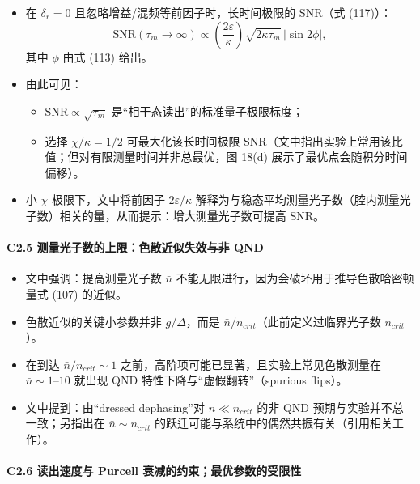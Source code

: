 \documentclass[12pt,a4paper,oneside]{ctexbook}
\providecommand{\tightlist}{%
  \setlength{\itemsep}{0pt}\setlength{\parskip}{0pt}}
\let\oldparagraph\paragraph
\renewcommand{\paragraph}[1]{\oldparagraph{#1}\mbox{}}
\begin{document}
\begin{itemize}
\tightlist
\item
  在 \(\delta_r=0\) 且忽略增益/混频等前因子时，长时间极限的 SNR（式
  (117)）： \[
  \mathrm{SNR}(\tau_m\rightarrow\infty)\propto
  \left(\frac{2\varepsilon}{\kappa}\right)\sqrt{2\kappa\tau_m}\,|\sin 2\phi|,
  \] 其中 \(\phi\) 由式 (113) 给出。
\item
  由此可见：

  \begin{itemize}
  \tightlist
  \item
    \(\mathrm{SNR}\propto \sqrt{\tau_m}\)
    是``相干态读出''的标准量子极限标度；
  \item
    选择 \(\chi/\kappa=1/2\) 可最大化该长时间极限
    SNR（文中指出实验上常用该比值；但对有限测量时间并非总最优，图 18(d)
    展示了最优点会随积分时间偏移）。
  \end{itemize}
\item
  小 \(\chi\) 极限下，文中将前因子 \(2\varepsilon/\kappa\)
  解释为与稳态平均测量光子数（腔内测量光子数）相关的量，从而提示：增大测量光子数可提高
  SNR。
\end{itemize}

\paragraph{C2.5 测量光子数的上限：色散近似失效与非
QND}\label{c2.5-ux6d4bux91cfux5149ux5b50ux6570ux7684ux4e0aux9650ux8272ux6563ux8fd1ux4f3cux5931ux6548ux4e0eux975e-qnd}

\begin{itemize}
\tightlist
\item
  文中强调：提高测量光子数 \(\bar{n}\)
  不能无限进行，因为会破坏用于推导色散哈密顿量式 (107) 的近似。
\item
  色散近似的关键小参数并非 \(g/\Delta\)，而是
  \(\bar{n}/n_{crit}\)（此前定义过临界光子数 \(n_{crit}\)）。
\item
  在到达 \(\bar{n}/n_{crit}\sim 1\)
  之前，高阶项可能已显著，且实验上常见色散测量在
  \(\bar{n}\sim 1\text{–}10\) 就出现 QND
  特性下降与``虚假翻转''（spurious flips）。
\item
  文中提到：由``dressed dephasing''对 \(\bar{n}\ll n_{crit}\) 的非 QND
  预期与实验并不总一致；另指出在 \(\bar{n}\sim n_{crit}\)
  的跃迁可能与系统中的偶然共振有关（引用相关工作）。
\end{itemize}

\paragraph{C2.6 读出速度与 Purcell
衰减的约束；最优参数的受限性}\label{c2.6-ux8bfbux51faux901fux5ea6ux4e0e-purcell-ux8870ux51cfux7684ux7ea6ux675fux6700ux4f18ux53c2ux6570ux7684ux53d7ux9650ux6027}
\end{document}
